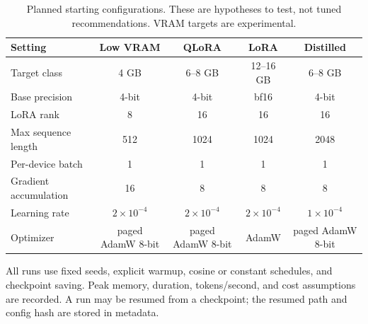 \begin{table}[t]
\centering
\small
\caption{Planned starting configurations. These are hypotheses to test, not
tuned recommendations. VRAM targets are experimental.}
\label{tab:training-configs}
\begin{tabular}{@{}lcccc@{}}
\toprule
Setting & Low VRAM & QLoRA & LoRA & Distilled \\
\midrule
Target class & 4 GB & 6--8 GB & 12--16 GB & 6--8 GB \\
Base precision & 4-bit & 4-bit & bf16 & 4-bit \\
LoRA rank & 8 & 16 & 16 & 16 \\
Max sequence length & 512 & 1024 & 1024 & 2048 \\
Per-device batch & 1 & 1 & 1 & 1 \\
Gradient accumulation & 16 & 8 & 8 & 8 \\
Learning rate & $2\times10^{-4}$ & $2\times10^{-4}$ & $2\times10^{-4}$ & $1\times10^{-4}$ \\
Optimizer & paged AdamW 8-bit & paged AdamW 8-bit & AdamW & paged AdamW 8-bit \\
\bottomrule
\end{tabular}
\end{table}

All runs use fixed seeds, explicit warmup, cosine or constant schedules, and
checkpoint saving. Peak memory, duration, tokens/second, and cost assumptions are
recorded. A run may be resumed from a checkpoint; the resumed path and config
hash are stored in metadata.
